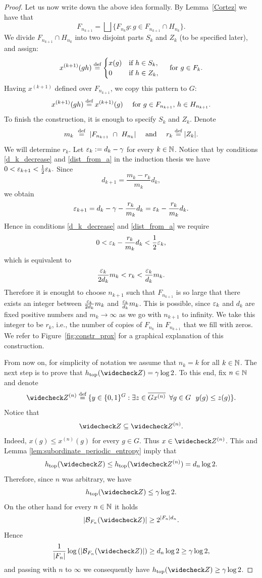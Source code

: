 \begin{proof}
Let us now write down the above idea formally.
%
By  Lemma~\ref{Cortez} we have that
\[
F_{n_{k+1}}=\bigsqcup\{F_{n_k}g:g\in F_{n_{k+1}}\cap H_{n_k}\}.
\]
We divide $F_{n_{k+1}}\cap H_{n_k}$ into two disjoint parts $S_k$ and $Z_k$ (to be specified later), and assign:
\[
x^{(k+1)}(gh) \stackrel{\textup{def}}{=} \begin{cases}
x(g) &\text{if } h\in S_k, \\
0 &\text{if } h\in Z_k, \end{cases} \quad \text{ for } g\in F_k.
\]
Having $x^{(k+1)}$ defined over $F_{n_{k+1}}$, we copy this pattern to $G$:
\[
x^{(k+1)}(gh) \stackrel{\textup{def}}{=} x^{(k+1)}(g) \quad \text{ for } g\in F_{n_{k+1}},\, h\in H_{n_{k+1}}.
\]
To finish the construction, it is enough to specify $S_k$ and $Z_k$. Denote
\[
m_k~\stackrel{\textup{def}}{=}~|F_{n_{k+1}}~\cap~ H_{n_k}|\quad\text{ and } \quad r_k\stackrel{\textup{def}}{=}|Z_k|.
\]
We will determine $r_k$.
Let $\varepsilon_k := d_k-\gamma$ for every $k\in\mathbb{N}$. Notice that by conditions \eqref{d_k_decrease} and \eqref{dist_from_a} in the induction thesis we have $0<\varepsilon_{k+1}<\frac{1}{2}\varepsilon_k.$ Since
\[
d_{k+1} = \frac{m_k-r_k}{m_k}d_k,
\]
we obtain
\[
\varepsilon_{k+1}=d_k-\gamma-\frac{r_k}{m_k}d_k = \varepsilon_k - \frac{r_k}{m_k}d_k.
\]
Hence in conditions \eqref{d_k_decrease} and \eqref{dist_from_a} we require
\[
0< \varepsilon_k - \frac{r_k}{m_k}d_k<\frac{1}{2}\varepsilon_k,
\]
which is equivalent to 
\[
\frac{\varepsilon_k}{2d_k}m_k<r_k<\frac{\varepsilon_k}{d_k}m_k.
\]
%
Therefore it is enought to choose $n_{k+1}$ such that $F_{n_{k+1}}$ is so large that there exists an integer between $\frac{\varepsilon_k}{2d_k}m_k$ and $\frac{\varepsilon_k}{d_k}m_k$. This is possible, since $\varepsilon_k$ and $d_k$ are fixed positive numbers and $m_k \to \infty$ as we go with $n_{k+1}$ to infinity. We take this integer to be $r_k$, i.e., the number of copies of $F_{n_k}$ in $F_{n_{k+1}}$ that we fill with zeros.
%
We refer to Figure~\ref{fig:constr_prox} for a graphical explanation of this construction.

From now on, for simplicity of notation we assume that $n_{k}=k$ for all $k \in \mathbb{N}$.
%
The next step is to prove that $\htop(\subord{Z)}=\gamma\log2$.
%
To this end, fix $n\in\mathbb{N}$ and denote
\[
\subord{Z}^{(n)} \defeq \{y\in\{0,1\}^G:\exists z\in \closure{Gx^{(n)}} \,\,\,\forall g\in G \,\,\,\, y(g)\leq z(g) \} .
\]
Notice that 
\begin{equation*}\label{eq:zawieranie_daszkow}
\subord{Z}\subseteq\subord{Z}^{(n)}.
\end{equation*}
Indeed,  $x(g)\leq x^{(n)}(g)$ for every $g\in G$. Thus $x\in \subord{Z}^{(n)}$. 
This and Lemma \ref{lem:subordinate_periodic_entropy} imply that
\begin{equation*}\label{eq:entropy_ineq}
\htop(\subord{Z})\leq\htop(\subord{Z}^{(n)})=d_n \log2.
\end{equation*}
Therefore, since $n$ was arbitrary, we have
\[
\htop(\subord{Z})\leq \gamma\log 2.
\]
On the other hand for every $n\in\mathbb{N}$ it holds
\[
\inmodul{\lang_{F_n}(\subord{Z})}\geq 2^{|F_n|d_n}.
\]
Hence 
\[
\frac{1}{|F_n|}\log\inparen{\inmodul{\lang_{F_n}(\subord{Z})}}\geq d_n\log 2\geq \gamma\log 2,
\]
and passing with $n$ to $\infty$ we consequently have $ \htop(\subord{Z})\geq \gamma\log 2$.
%




\end{proof}

